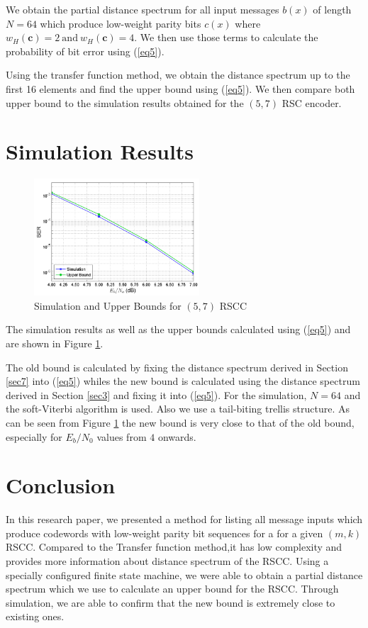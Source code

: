 \documentclass[fontsize=12pt]{article}
\begin{document}
We obtain the partial distance spectrum for all input messages $b(x)$ of length $N=64$ which produce low-weight parity bits
$c(x)$ where $w_H(\textbf{c})=2 ~\text{and} ~ w_H(\textbf{c})=4$. We then use those terms to calculate the probability of bit error using (\ref{eq5}). 

Using the transfer function method, we obtain the distance spectrum up to the first 16 elements and  find the upper bound using (\ref{eq5}).
We then compare both upper bound to the simulation results obtained for the $(5,7)$ RSC encoder.

\section{Simulation Results}
\label{sec5}

\begin{figure}[h]
\centering
		\includegraphics[width=0.55\textwidth]{paperg2.png}
		\caption{Simulation and Upper Bounds for $(5,7)$ RSCC}
		\label{fig3}
		\end{figure}
		
		The simulation results as well as the upper bounds calculated using (\ref{eq5}) and are shown in Figure \ref{fig3}. 
		
		The old bound is calculated by fixing  the distance spectrum derived in Section \ref{sec7} into  (\ref{eq5}) whiles the new bound is calculated using the distance spectrum derived in Section \ref{sec3} and fixing it into (\ref{eq5}). For the simulation, $N=64$ and the soft-Viterbi algorithm is used. Also we use a tail-biting trellis structure. As can be seen from Figure \ref{fig3} the new bound is very close to that of the old bound, especially for $E_b/N_0$ values from $4$ onwards. 

\section{Conclusion}
\label{sec6}
In this research paper, we presented a method for listing all message inputs which produce codewords with low-weight parity bit sequences for a for a given $(m,k)$ RSCC. Compared to the Transfer function method,it has low complexity and provides more information about distance spectrum of the RSCC. Using a specially configured finite state machine, we were able to obtain a partial distance spectrum which we use to calculate an upper bound for the RSCC. Through simulation, we are able to confirm that the new bound is extremely close to existing ones. 
\end{document}
